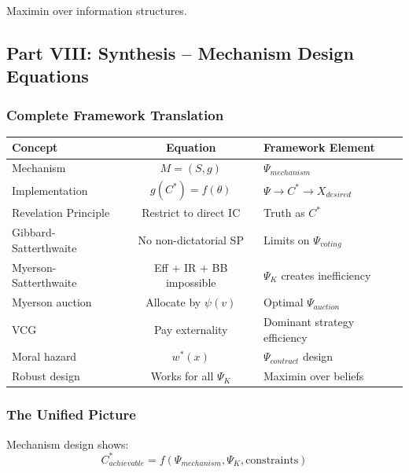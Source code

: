Maximin over information structures.

\subsection{Part VIII: Synthesis – Mechanism Design Equations}

\subsubsection{Complete Framework Translation}

\begin{center}
\renewcommand{\arraystretch}{1.5}
\begin{tabular}{|l|c|l|}
\hline
\textbf{Concept} & \textbf{Equation} & \textbf{Framework Element} \\
\hline
Mechanism & $M = (S, g)$ & $\Psi_{mechanism}$ \\
\hline
Implementation & $g(C^*) = f(\theta)$ & $\Psi \to C^* \to X_{desired}$ \\
\hline
Revelation Principle & Restrict to direct IC & Truth as $C^*$ \\
\hline
Gibbard-Satterthwaite & No non-dictatorial SP & Limits on $\Psi_{voting}$ \\
\hline
Myerson-Satterthwaite & Eff + IR + BB impossible & $\Psi_K$ creates inefficiency \\
\hline
Myerson auction & Allocate by $\psi(v)$ & Optimal $\Psi_{auction}$ \\
\hline
VCG & Pay externality & Dominant strategy efficiency \\
\hline
Moral hazard & $w^*(x)$ & $\Psi_{contract}$ design \\
\hline
Robust design & Works for all $\Psi_K$ & Maximin over beliefs \\
\hline
\end{tabular}
\end{center}

\subsubsection{The Unified Picture}

Mechanism design shows:
\begin{equation}
\boxed{
C^*_{achievable} = f(\Psi_{mechanism}, \Psi_K, \text{constraints})
}
\end{equation}


